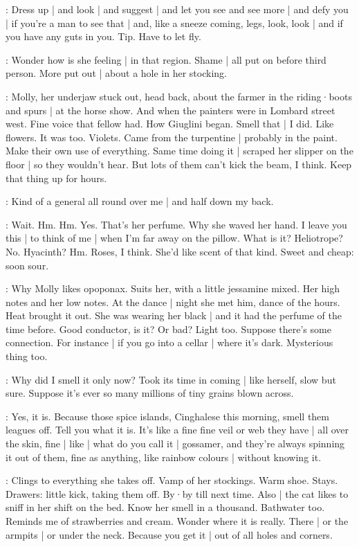 \BloomAbstract:
Dress up |
and look |
and suggest |
and let you see and see more |
and defy you |
if you're a man to see that |
and,
like a sneeze coming,
legs,
look,
look |
and if you have any guts in you.
Tip.
Have to let fly.

\BloomCurrent:
Wonder how is she feeling |
in that region.
Shame |
all put on before third person.
More put out |
about a hole in her stocking.

\BloomHist:
Molly,
her underjaw stuck out,
head back,
about the farmer in the riding·boots and spurs |
at the horse show.%
And when the painters were in Lombard street west.
Fine voice that fellow had.
How Giuglini began.
Smell that |
I did.
Like flowers.
It was too.
Violets.
Came from the turpentine |
probably in the paint.
Make their own use of everything.
Same time doing it |
scraped her slipper on the floor |
so they wouldn't hear.
But lots of them can't kick the beam,
I think.
Keep that thing up for hours.

\BloomCurrent:
Kind of a general all round over me |
and half down my back.

\BloomCurrent:
Wait.
Hm.
Hm.
Yes.
That's her perfume.
Why she waved her hand.
I leave you this |
to think of me |
when I'm far away on the pillow.
What is it?
Heliotrope?
No.
Hyacinth?
Hm.
Roses,
I think.
She'd like scent of that kind.
Sweet and cheap:
soon sour.%

\BloomHist:
Why Molly likes opoponax.
Suits her,
with a little jessamine mixed.
Her high notes and her low notes.
At the dance |
night she met him,
dance of the hours.
Heat brought it out.
She was wearing her black |
and it had the perfume of the time before.
Good conductor,
is it?
Or bad?
Light too.
Suppose there's some connection.
For instance |
if you go into a cellar |
where it's dark.
Mysterious thing too.

\BloomCurrent:
Why did I smell it only now?
Took its time in coming |
like herself,
slow but sure.
Suppose it's ever so many millions of tiny grains blown across.

\BloomAbstract:
Yes,
it is.
Because those spice islands,
Cinghalese this morning,
smell them leagues off.
Tell you what it is.
It's like a fine fine veil
or web they have |
all over the skin,
fine |
like |
what do you call it |
gossamer,%
and they're always spinning it out of them,
fine as anything,
like rainbow colours |
without knowing it.

\BloomHist:
Clings to everything she takes off.
Vamp of her stockings.
Warm shoe.
Stays.
Drawers:
little kick,
taking them off.
By·by till next time.
Also |
the cat likes to sniff in her shift
on the bed.
Know her smell in a thousand.
Bathwater too.
Reminds me of strawberries and cream.
Wonder where it is really.
There |
or the armpits |
or under the neck.
Because you get it |
out of all holes and corners.

